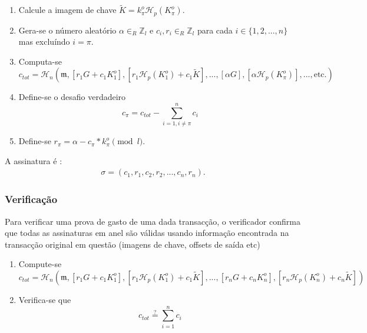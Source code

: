 \begin{enumerate}
	\item Calcule a imagem de chave \(\tilde{K} = k^o_\pi \mathcal{H}_p(K^o_\pi)\).

	\item Gera-se o número aleatório \(\alpha \in_R \mathbb{Z}_l\) e  \(c_i, r_i \in_R \mathbb{Z}_l\) para cada \(i \in \{1, 2, ..., n\}\) mas excluíndo \(i = \pi\).

	\item Computa-se
	\[c_{tot} = \mathcal{H}_n(\mathfrak{m},[r_1 G + c_1 K^o_1],[r_1 \mathcal{H}_p(K^o_1) + c_1 \tilde{K}],...,[\alpha G],[\alpha \mathcal{H}_p(K^o_{\pi})],...,\textrm{etc.})\]

	\item Define-se o desafio verdadeiro
	\[c_{\pi} = c_{tot} - \sum^{n}_{i=1,i\neq \pi} c_i\]

	\item Define-se \(r_{\pi} = \alpha - c_{\pi}*k^o_{\pi} \pmod l\).
\end{enumerate}

A assinatura é :
\begin{align*}
\sigma = (c_1, r_1,c_2,r_2,...,c_n,r_n).
\end{align*}

\subsubsection*{Verificação}

Para verificar  uma prova de gasto de uma dada transacção, o verificador confirma que todas as assinaturas em anel são válidas usando informação encontrada na transacção original em questão (imagens de chave, offsets de saída etc)


\begin{enumerate}
	\item Compute-se
	\[c_{tot} = \mathcal{H}_n(\mathfrak{m},[r_1 G + c_1 K^o_1],[r_1 \mathcal{H}_p(K^o_1) + c_1 \tilde{K}],...,[r_n G + c_n K^o_n],[r_n \mathcal{H}_p(K^o_n) + c_n \tilde{K}])\]

	\item Verifica-se que 
	\[c_{tot} \stackrel{?}{=} \sum^{n}_{i=1} c_i\]
\end{enumerate}

